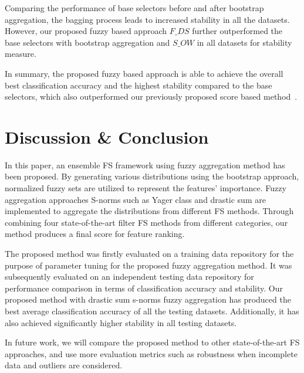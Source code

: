 \documentclass[conference]{IEEEtran}
\begin{document}
Comparing the performance of base selectors before and after bootstrap aggregation, the bagging process leads to increased stability in all the datasets. However, our proposed fuzzy based approach $F\_{DS}$ further outperformed the base selectors with bootstrap aggregation and $S\_{OW}$ in all datasets for stability measure. 

In summary, the proposed fuzzy based approach is able to achieve the overall best classification accuracy and the highest stability compared to the base selectors, which also outperformed our previously proposed score based method~\cite{shen2019novel}.


\section{Discussion \& Conclusion}
In this paper, an ensemble FS framework using fuzzy aggregation method has been proposed. By generating various distributions using the bootstrap approach, normalized fuzzy sets are utilized to represent the features' importance. Fuzzy aggregation approaches S-norms such as Yager class and drastic sum are implemented to aggregate the distributions from different FS methods. Through combining four state-of-the-art filter FS methods from different categories, our method produces a final score for feature ranking.

The proposed method was firstly evaluated on a training data repository for the purpose of parameter tuning for the proposed fuzzy aggregation method. It was subsequently evaluated on an independent testing data repository for performance comparison in terms of classification accuracy and stability. Our proposed method with drastic sum s-norms fuzzy aggregation has produced the best average classification accuracy of all the testing datasets. Additionally, it has also achieved significantly higher stability in all testing datasets.

In future work, we will compare the proposed method to other state-of-the-art FS approaches, and use more evaluation metrics such as robustness when incomplete data and outliers are considered.










%

\end{document}

